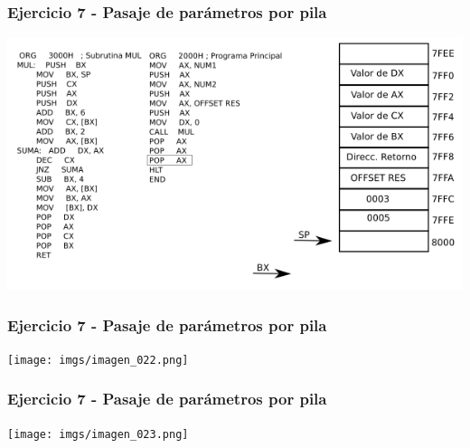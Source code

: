 \documentclass{beamer}
\begin{document}
\begin{frame}
\frametitle{Ejercicio 7 - Pasaje de parámetros por pila}
\includegraphics[scale=0.70]{imgs/imagen_021.png}
\end{frame}

\begin{frame}
\frametitle{Ejercicio 7 - Pasaje de parámetros por pila}
\texttt{[image: imgs/imagen\_022.png]}
\end{frame}

\begin{frame}
\frametitle{Ejercicio 7 - Pasaje de parámetros por pila}
\texttt{[image: imgs/imagen\_023.png]}
\end{frame}
\end{document}
